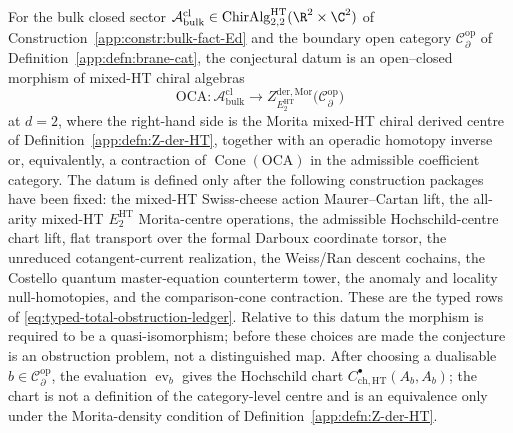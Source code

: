 \begin{conj}\label{app:conj:mixed-HT-Deligne}
For the bulk closed sector
$\mathcal A^{\mathrm{cl}}_{\mathrm{bulk}}\in\mathrm{ChirAlg}^{\mathrm{HT}}_{2,2}(\R^2\times\C^2)$
of Construction~\ref{app:constr:bulk-fact-Ed} and the boundary open
category $\mathcal{C}^{\mathrm{op}}_\partial$ of
Definition~\ref{app:defn:brane-cat}, the conjectural datum is an
open--closed morphism of mixed-HT chiral algebras
  \[
	  \mathrm{OCA}\colon
	  \mathcal A^{\mathrm{cl}}_{\mathrm{bulk}}
	   \longrightarrow
	   Z^{\mathrm{der},\mathrm{Mor}}_{E_2^{\mathrm{HT}}}
	   \bigl(\mathcal{C}^{\mathrm{op}}_\partial\bigr)
	\]
at $d=2$, where the right-hand side is the Morita mixed-HT chiral
derived centre of Definition~\ref{app:defn:Z-der-HT}, together with an
operadic homotopy inverse or, equivalently, a contraction of
\(\operatorname{Cone}(\mathrm{OCA})\) in the admissible coefficient
category.  The datum is defined only after the following construction
packages have been fixed: the mixed-HT Swiss-cheese action
Maurer--Cartan lift, the all-arity mixed-HT \(E_2^{\mathrm{HT}}\)
Morita-centre operations, the admissible Hochschild-centre chart lift,
flat transport over the formal Darboux coordinate torsor, the unreduced
cotangent-current realization,
the Weiss/Ran descent cochains, the Costello quantum master-equation
counterterm tower, the anomaly and locality null-homotopies, and the
comparison-cone contraction.  These are the typed rows of
\eqref{eq:typed-total-obstruction-ledger}.  Relative to this datum the
morphism is required to be a quasi-isomorphism; before these choices are
made the conjecture is an obstruction problem, not a distinguished map.
After choosing a dualisable
\(b\in\mathcal C^{\mathrm{op}}_\partial\), the evaluation
\(\operatorname{ev}_b\) gives the Hochschild chart
\(C^\bullet_{\mathrm{ch},\mathrm{HT}}(A_b,A_b)\); the chart is not a
definition of the category-level centre and is an equivalence only under
the Morita-density condition of Definition~\ref{app:defn:Z-der-HT}.


\end{conj}
